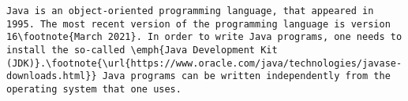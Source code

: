 \begin{verbatim}
Java is an object-oriented programming language, that appeared in 1995. The most recent version of the programming language is version 16\footnote{March 2021}. In order to write Java programs, one needs to install the so-called \emph{Java Development Kit (JDK)}.\footnote{\url{https://www.oracle.com/java/technologies/javase-downloads.html}} Java programs can be written independently from the operating system that one uses.
\end{verbatim}

	
